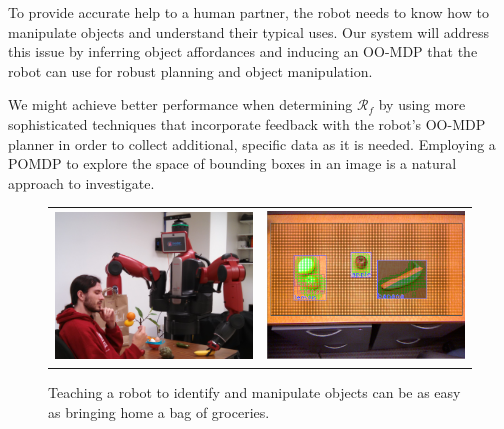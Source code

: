 \documentclass[12pt]{article}
\numberwithin{equation}{section}
\numberwithin{table}{section}
\numberwithin{figure}{section}
\begin{document}
To provide accurate help
to a human partner, the robot needs to know how to manipulate objects and understand their typical uses.
Our system will address this issue by inferring object affordances and inducing an OO-MDP \cite{OOMDP} that the robot
can use for robust planning and object manipulation.

We might achieve better performance when determining $\mathcal{R}_f$
by using more sophisticated techniques that incorporate feedback with the robot's OO-MDP planner in 
order to collect additional, specific data as it is needed.  
Employing a POMDP \cite{POMDP} to explore the space of bounding boxes in an image is a natural approach to investigate.

\begin{figure}
  \begin{center}
    \begin{tabular}{l c}
      \includegraphics[width=200px, height=150px]{robo2.png} &
      \includegraphics[width=200px, height=150px]{screen2.png} \\
    \end{tabular}
  \end{center}
  \caption{Teaching a robot to identify and manipulate objects can be as easy as bringing home
	    a bag of groceries.}
\end{figure}

\end{document}
